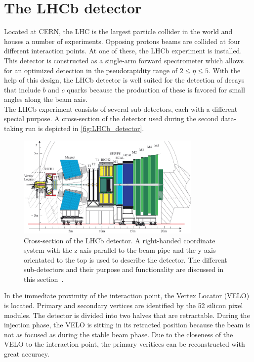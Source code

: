 \section{The LHCb detector}
\label{sec:Detector}
Located at CERN, the LHC is the largest particle collider in the world and houses a number of experiments. Opposing protons beams are collided at four different
interaction points. At one of these, the LHCb experiment is installed. This detector is constructed as a single-arm forward spectrometer which allows for an optimized detection in the pseudorapidity range
of $2≤\eta≤5$. With the help of this design, the LHCb detector is well suited for the detection of decays that include $b$ and $c$ quarks because the production of these is favored for small angles along the
beam axis. \\
The LHCb experiment consists of several sub-detectors, each with a different special purpose. A cross-section of the detector used during the second data-taking run is depicted in \autoref{fig:LHCb_detector}.
\begin{figure}
    \centering
    \includegraphics[width=0.8\textwidth]{content/pics/LHCb_detector.pdf}
    \caption{Cross-section of the LHCb detector. A right-handed coordinate system with the z-axis parallel to the beam pipe and the y-axis orientated to the top is used to describe the detector.%
    The different sub-detectors and their purpose and functionality are discussed in this section~\cite{LHCb_detector}.}
    \label{fig:LHCb_detector}
\end{figure}
In the immediate proximity of the interaction point, the Vertex Locator (VELO) is located. Primary and secondary vertices are identified by the 52 silicon pixel modules. The detector is divided into two
halves that are retractable. During the injection phase, the VELO is sitting in its retracted position because the beam is not as focused as during the stable beam phase. Due to the closeness of the VELO to the 
interaction point, the primary veritices can be reconstructed with great accuracy. \\
